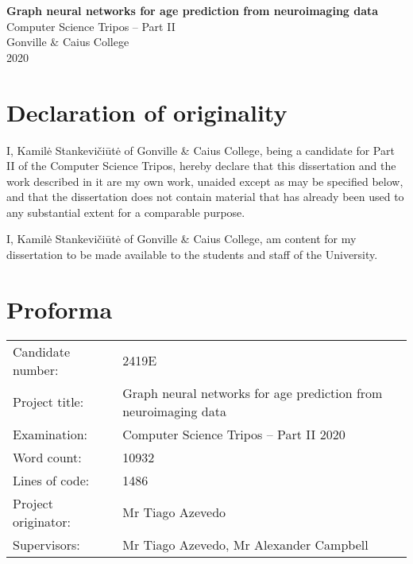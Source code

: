 \pagestyle{empty}
\thispagestyle{empty}


\vspace*{60mm}
\begin{center}
\Large
\textbf{Graph neural networks for age prediction from neuroimaging data} \\[5mm]
\large
Computer Science Tripos -- Part II \\[5mm]
Gonville \& Caius College \\[5mm]
2020
\end{center}


\pagestyle{plain}
\newpage
\chapter*{Declaration of originality}

I, Kamilė Stankevičiūtė of Gonville \& Caius College, being a candidate for Part II of the Computer Science Tripos, hereby declare that this dissertation and the work described in it are my own work, unaided except as may be specified below, and that the dissertation does not contain material that has already been used to any substantial extent for a comparable purpose.

I, Kamilė Stankevičiūtė of Gonville \& Caius College, am content for my dissertation to be made available to the students and staff of the University.

\bigskip
{}

\medskip
{}

\chapter*{Proforma}

\begin{tabular}{ll}
Candidate number:   & 2419E                  \\
Project title:      & Graph neural networks for age prediction from neuroimaging data \\
Examination:        & Computer Science Tripos -- Part II 2020 \\
Word count:         & 10932\footnotemark[1] \\
Lines of code:      & 1486  \\
Project originator: & Mr Tiago Azevedo                        \\
Supervisors:        & Mr Tiago Azevedo, Mr Alexander Campbell \\ 
\end{tabular}

